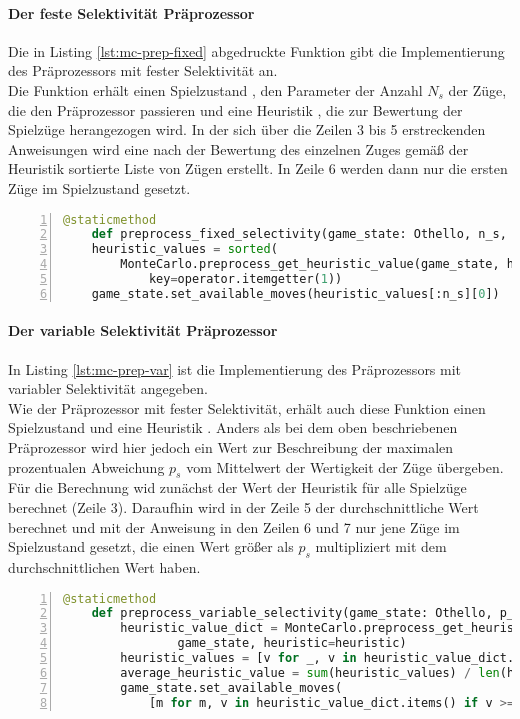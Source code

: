 \paragraph{Der feste Selektivität Präprozessor}
Die in Listing \ref{lst:mc-prep-fixed} abgedruckte Funktion gibt die Implementierung des Präprozessors mit fester Selektivität an.
\\Die Funktion erhält einen Spielzustand , den Parameter  der Anzahl $N_{s}$ der Züge, die den Präprozessor passieren und eine Heuristik , die zur Bewertung der Spielzüge herangezogen wird. In der sich über die Zeilen 3 bis 5 erstreckenden Anweisungen wird eine nach der Bewertung des einzelnen Zuges gemäß der Heuristik sortierte Liste von Zügen erstellt. In Zeile 6 werden dann nur die ersten  Züge im Spielzustand  gesetzt.
\begin{lstlisting}[basicstyle=\footnotesize, caption = {Die Funktion \code{preprocess\_fixed\_slectivity}}, language = python, captionpos = t , numbers=left, label={lst:mc-prep-fixed}]
	@staticmethod	    
	def preprocess_fixed_selectivity(game_state: Othello, n_s, heuristic):
    heuristic_values = sorted(
        MonteCarlo.preprocess_get_heuristic_value(game_state, heuristic=heuristic).items(),
            key=operator.itemgetter(1))
    game_state.set_available_moves(heuristic_values[:n_s][0])
\end{lstlisting}
\paragraph{Der variable Selektivität Präprozessor}
In Listing \ref{lst:mc-prep-var} ist die Implementierung des Präprozessors mit variabler Selektivität angegeben.
\\Wie der Präprozessor mit fester Selektivität, erhält auch diese Funktion einen Spielzustand  und eine Heuristik . Anders als bei dem oben beschriebenen Präprozessor wird hier jedoch ein Wert  zur Beschreibung der maximalen prozentualen Abweichung $p_{s}$ vom Mittelwert der Wertigkeit der Züge übergeben.
\\Für die Berechnung wid zunächst der Wert der Heuristik für alle Spielzüge berechnet (Zeile 3). Daraufhin wird in der Zeile 5 der durchschnittliche Wert berechnet und mit der Anweisung in den Zeilen 6 und 7 nur jene Züge im Spielzustand gesetzt, die einen Wert größer als $p_{s}$ multipliziert mit dem durchschnittlichen Wert haben.
\begin{lstlisting}[basicstyle=\footnotesize, caption = {Die Funktion \code{preprocess\_variable\_slectivity}}, language = python, captionpos = t , numbers=left, label={lst:mc-prep-var}]
	@staticmethod
    def preprocess_variable_selectivity(game_state: Othello, p_s, heuristic):
        heuristic_value_dict = MonteCarlo.preprocess_get_heuristic_value(
        		game_state, heuristic=heuristic)
        heuristic_values = [v for _, v in heuristic_value_dict.items()]
        average_heuristic_value = sum(heuristic_values) / len(heuristic_values)
        game_state.set_available_moves(
            [m for m, v in heuristic_value_dict.items() if v >= p_s * average_heuristic_value])
\end{lstlisting}

